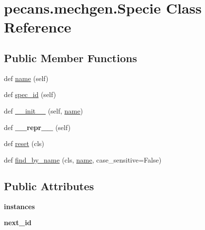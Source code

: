 \hypertarget{classpecans_1_1mechgen_1_1Specie}{}\section{pecans.\+mechgen.\+Specie Class Reference}
\label{classpecans_1_1mechgen_1_1Specie}
\subsection*{Public Member Functions}
\begin{DoxyCompactItemize}
\item 
def \hyperlink{classpecans_1_1mechgen_1_1Specie_a41e559347b3423f3516301842385613c}{name} (self)
\item 
def \hyperlink{classpecans_1_1mechgen_1_1Specie_ad58b10b6479f367d6e33ef8744257445}{spec\+\_\+id} (self)
\item 
def \hyperlink{classpecans_1_1mechgen_1_1Specie_a4b9972921c40c021e7b56d5fc54324cc}{\+\_\+\+\_\+init\+\_\+\+\_\+} (self, \hyperlink{classpecans_1_1mechgen_1_1Specie_a41e559347b3423f3516301842385613c}{name})
\item 
def {\bfseries \+\_\+\+\_\+repr\+\_\+\+\_\+} (self)\hypertarget{classpecans_1_1mechgen_1_1Specie_a069a0d0e2f85bb2e7cf1f6471da4889e}{}\label{classpecans_1_1mechgen_1_1Specie_a069a0d0e2f85bb2e7cf1f6471da4889e}

\item 
def \hyperlink{classpecans_1_1mechgen_1_1Specie_a6901f1ddd421e3a9c8064b2800380415}{reset} (cls)
\item 
def \hyperlink{classpecans_1_1mechgen_1_1Specie_a34e33f51afc5238cbfcf73eeda600d99}{find\+\_\+by\+\_\+name} (cls, \hyperlink{classpecans_1_1mechgen_1_1Specie_a41e559347b3423f3516301842385613c}{name}, case\+\_\+sensitive=False)
\end{DoxyCompactItemize}
\subsection*{Public Attributes}
\begin{DoxyCompactItemize}
\item 
{\bfseries instances}\hypertarget{classpecans_1_1mechgen_1_1Specie_a2ec5debad50ea97e767e38ef840df970}{}\label{classpecans_1_1mechgen_1_1Specie_a2ec5debad50ea97e767e38ef840df970}

\item 
{\bfseries next\+\_\+id}\hypertarget{classpecans_1_1mechgen_1_1Specie_a3b362b20f1628091a44eae5325b4840a}{}\label{classpecans_1_1mechgen_1_1Specie_a3b362b20f1628091a44eae5325b4840a}

\end{DoxyCompactItemize}
